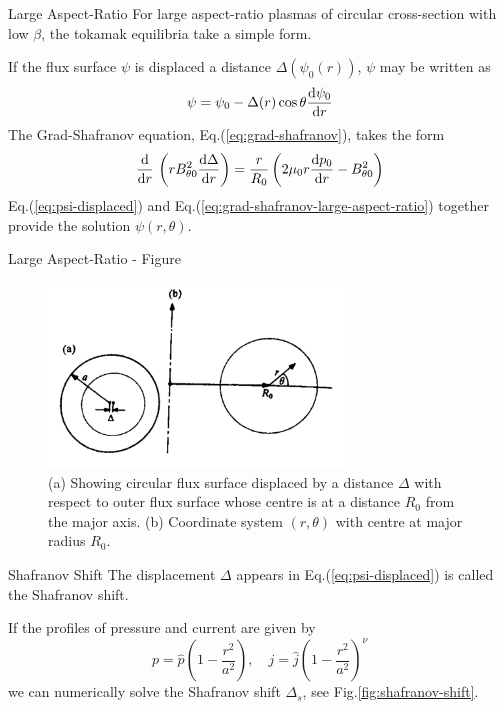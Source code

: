 \begin{frame} {Large Aspect-Ratio}
  For large aspect-ratio plasmas of circular cross-section with low $\beta$, the tokamak equilibria take a simple form.

  If the flux surface $\psi$ is displaced a distance $\Delta(\psi_0(r))$, $\psi$ may be written as
  \begin{equation}
    \psi = \psi_0 - \Delta(r)\cos\theta\dv{\psi_0}{r}
    \label{eq:psi-displaced}
  \end{equation}
  The Grad-Shafranov equation, Eq.(\ref{eq:grad-shafranov}), takes the form
  \begin{equation}
    \dv{r}\,\left(rB_{\theta0}^2\dv{\Delta}{r}\right) = \frac{r}{R_0}\left(2\mu_0r\dv{p_0}{r} - B_{\theta0}^2\right)
    \label{eq:grad-shafranov-large-aspect-ratio}
  \end{equation}
  Eq.(\ref{eq:psi-displaced}) and Eq.(\ref{eq:grad-shafranov-large-aspect-ratio}) together provide the solution $\psi(r,\theta)$.
\end{frame}

\begin{frame}{Large Aspect-Ratio - Figure}
  \begin{figure}
    \centering
    \includegraphics[width=0.7\textwidth]{figures/large-aspect-ratio.png}
    \caption{(a) Showing circular flux surface displaced by a distance $\Delta$ with respect to outer flux surface whose centre is at a distance $R_0$ from the major axis. (b) Coordinate system $(r,\theta)$ with centre at major radius $R_0$.}
    \label{fig:large-aspect-ratio}
  \end{figure}
\end{frame}

\begin{frame} {Shafranov Shift}
  The displacement $\Delta$ appears in Eq.(\ref{eq:psi-displaced}) is called the Shafranov shift.

  If the profiles of pressure and current are given by
  \[ p = \hat{p}\left(1-\frac{r^2}{a^2}\right),\quad
    j = \hat{j}\left(1-\frac{r^2}{a^2}\right)^\nu
  \]
  we can numerically solve the Shafranov shift $\Delta_s$, see Fig.\ref{fig:shafranov-shift}.
\end{frame}

